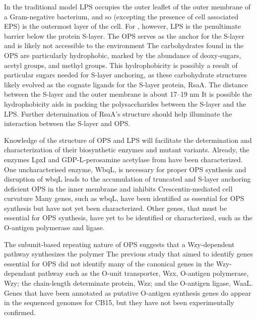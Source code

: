 	In the traditional model \ac{LPS} occupies the outer leaflet of the outer membrane of a Gram-negative bacterium, and so (excepting the presence of cell associated \ac{EPS}) is the outermost layer of the cell. For \caulobacter, however, \ac{LPS} is the penultimate barrier below the protein \ac{S-layer}. The \caulobacter{} \ac{OPS} serves as the anchor for the S-layer and is likely not accessible to the environment The carbohydrates found in the \ac{OPS} are particularly hydrophobic, marked by the abundance of deoxy-sugars, acetyl groups, and methyl groups. This hydrophobicity is possibly a result of particular sugars needed for \ac{S-layer} anchoring, as these carbohydrate structures likely evolved as the cognate ligands for the \ac{S-layer} protein, RsaA. The distance between the \ac{S-layer} and the outer membrane is about 17--19 nm It is possible the hydrophobicity aids in packing the polysaccharides between the S-layer and the \ac{LPS}. Further determination of RsaA's structure should help illuminate the interaction between the S-layer and \ac{OPS}.

	Knowledge of the structure of \caulobacter{} \ac{OPS} and \ac{LPS} will facilitate the determination and characterization of their biosynthetic enzymes and mutant variants. Already, the enzymes LpxI and GDP-L-perosamine acetylase from \caulobacter have been characterized. One uncharacterised enzyme, WbqL, is necessary for proper \ac{OPS} synthesis and disruption of wbqL leads to the accumulation of truncated and S-layer anchoring deficient \ac{OPS} in the inner membrane and inhibits Crescentin-mediated cell curvature Many genes, such as wbqL, have been identified as essential for \ac{OPS} synthesis but have not yet been characterized. Other genes, that must be essential for \ac{OPS} synthesis, have yet to be identified or characterized, such as the O-antigen polymerase and ligase.


	The subunit-based repeating nature of \caulobacter{} \ac{OPS} suggests that a Wzy-dependent pathway synthesizes the polymer The previous study that aimed to identify genes essential for \ac{OPS} did not identify many of the canonical genes in the Wzy-dependant pathway such as the O-unit transporter, Wzx, O-antigen polymerase, Wzy; the chain-length determinate protein, Wzz; and the O-antigen ligase, WaaL. Genes that have been annotated as putative O-antigen synthesis genes do appear in the sequenced genomes for \caulobacter CB15, but they have not been experimentally confirmed. 

